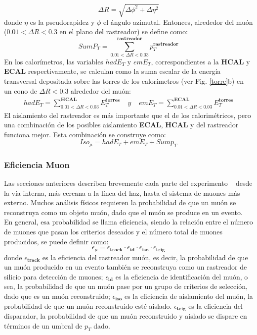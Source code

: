 \begin{equation}
\Delta R = \sqrt{\Delta \phi^2 + \Delta\eta^2}
\end{equation}
donde $\eta$ es la pseudorapidez y $\phi$ el ángulo azimutal. Entonces, alrededor del muón ($0.01 < \Delta R < 0.3$ en el plano del rastreador) se define como:
\begin{equation}
SumP_T =\sum_{0.01<\Delta R <0.03}^\mathbf{rastreador} p_T^\mathbf{rastreador}
\end{equation}
En los calorímetros, las variables $hadE_T$ y $emE_T$, correspondientes a la \textbf{HCAL} y \textbf{ECAL} respectivamente, se calculan como la suma escalar de la energía transversal depositada sobre las torres de los calorímetros (ver Fig. \ref{torre}b) en un cono de $\Delta R < 0.3$ alrededor del muón:
\begin{eqnarray}
hadE_T =\sum_{0.01<\Delta R <0.03}^\mathbf{HCAL} E_T^\mathbf{torres}  ~~~~~ y ~~~~~ emE_T =\sum_{0.01<\Delta R <0.03}^\mathbf{ECAL} E_T^\mathbf{torres} 
\end{eqnarray}
El aislamiento del rastreador es más importante que el de los calorimétricos, pero una combinación de los posibles aislamiento \textbf{ECAL}, \textbf{HCAL} y del rastreador funciona mejor. Esta combinación se construye como:
\begin{equation}
Iso_\mu = hadE_T + emE_T  +Sump_T
\end{equation}





\subsubsection{Eficiencia Muon}

Las secciones anteriores describen brevemente cada parte del experimento \CMS ~ desde la vía interna, más cercana a la línea del haz, hasta el sistema de muones más externo. Muchos análisis físicos requieren la probabilidad de que un muón se reconstruya como un objeto muón, dado que el muón se produce en un evento. En general, esa probabilidad se llama eficiencia, siendo la relación entre el número de muones que pasan los criterios deseados y el número total de muones producidos, se puede definir como:
\begin{equation}
\epsilon_\mu = \epsilon_\mathbf{track} \cdot \epsilon_\mathbf{id} \cdot 
\epsilon_\mathbf{iso} \cdot  \epsilon_\mathbf{trig}
\end{equation}
donde $\epsilon_\mathbf{track}$ es la eficiencia del rastreador muón, es decir, la probabilidad de que un muón producido en un evento también se reconstruya como un rastreador de silicio para detección de muones; $\epsilon_\mathbf{id}$ es la eficiencia de identificación del muón, o sea, la probabilidad de que un muón pase por un grupo de criterios de selección, dado que es un muón reconstruido; $\epsilon_\mathbf{iso}$ es la eficiencia de aislamiento del muón, la probabilidad de que un muón reconstruido esté aislado. $\epsilon_\mathbf{trig}$ es la eficiencia del disparador, la probabilidad de que un muón reconstruido y aislado se dispare en términos de un umbral de $p_{T}$ dado.

